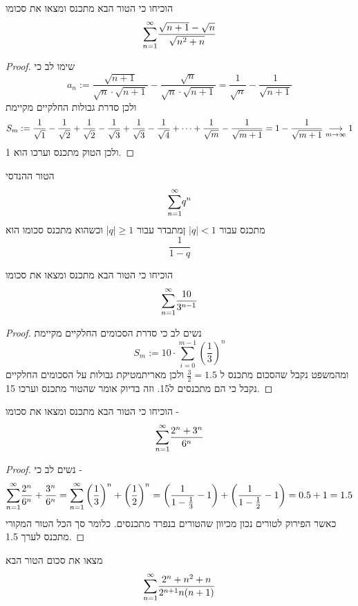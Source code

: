 \documentclass{article}
\begin{document}
\begin{exercise}
הוכיחו כי הטור הבא מתכנס ומצאו את סכומו
\[\overset{\infty}{\underset{n=1}{\sum}} \frac{\sqrt{n+1}-\sqrt{n}}{\sqrt{n^2+n}}\]
\end{exercise}

\begin{proof}
שימו לב כי
\[a_n:=\frac{\sqrt{n+1}}{\sqrt{n}\cdot\sqrt{n+1}} - \frac{\sqrt{n}}{\sqrt{n}\cdot\sqrt{n+1}} = \frac{1}{\sqrt{n}}-\frac{1}{\sqrt{n+1}}\]
ולכן סדרת גבולות החלקיים מקיימת
\[S_m:= \frac{1}{\sqrt{1}} - \frac{1}{\sqrt{2}} + \frac{1}{\sqrt{2}} - \frac{1}{\sqrt{3}} + \frac{1}{\sqrt{3}} - \frac{1}{\sqrt{4}}+ \dots + \frac{1}{\sqrt{m}} - \frac{1}{\sqrt{m+1}} = 1-\frac{1}{\sqrt{m+1}}\underset{m\rightarrow\infty}{\longrightarrow} 1\]
ולכן הטוק מתכנס וערכו הוא 1.
\end{proof}

\begin{theorem}
הטור ההנדסי 
\[\overset{\infty}{\underset{n=1}{\sum}} q^n\]
מתכנס עבור 
$|q|< 1$
ןמתבדר עבור 
$|q|\geq 1$
וכשהוא מתכנס סכומו הוא 
\[\frac{1}{1-q}\]
\end{theorem}

\begin{exercise}
הוכיחו כי הטור הבא מתכנס ומצאו את סכומו 
\[\overset{\infty}{\underset{n=1}{\sum}} \frac{10}{3^{n-1}}\]
\end{exercise}

\begin{proof}
נשים לב כי סדרת הסכומים החלקיים מקיימת
\[S_m:= 10\cdot \sum_{i=0}^{m-1} \left(\frac{1}{3}\right)^n\]
ומהמשפט נקבל שהסכום מתכנס ל 
$\frac{3}{2}=1.5$
ולכן מאריתמטיקת גבולות על הסכומים החלקיים נקבל כי הם מתכנסים ל15. וזה בדיוק אומר שהטור מתכנס וערכו 15.
\end{proof}

\begin{exercise}
הוכיחו כי הטור הבא מתכנס ומצאו את סכומו - 
\[\overset{\infty}{\underset{n=1}{\sum}} \frac{2^n+3^n}{6^n}\]
\end{exercise}

\begin{proof}
נשים לב כי - 
\[\overset{\infty}{\underset{n=1}{\sum}} \frac{2^n}{6^n} + \frac{3^n}{6^n} = \overset{\infty}{\underset{n=1}{\sum}} \left(\frac{1}{3}\right)^n + \left(\frac{1}{2}\right)^n = \left(\frac{1}{1-\frac{1}{3}} - 1 \right) + \left(\frac{1}{1-\frac{1}{2}} - 1 \right) = 0.5+1 = 1.5\]
כאשר הפירוק לטורים נכון מכיוון שהטורים בנפרד מתכנסים. כלומר סך הכל הטור המקורי מתכנס לערך 1.5.
\end{proof}

\begin{exercise}
מצאו את סכום הטור הבא
\[\overset{\infty}{\underset{n=1}{\sum}}\frac{2^n + n^2 +n}{2^{n+1}n(n+1)}\]
\end{exercise}
\end{document}
